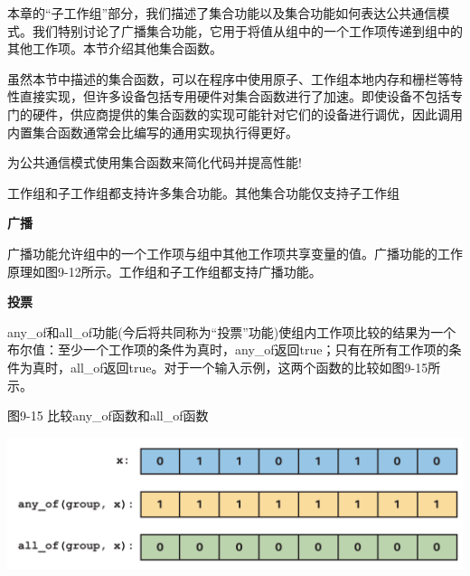 本章的“子工作组”部分，我们描述了集合功能以及集合功能如何表达公共通信模式。我们特别讨论了广播集合功能，它用于将值从组中的一个工作项传递到组中的其他工作项。本节介绍其他集合函数。\par

虽然本节中描述的集合函数，可以在程序中使用原子、工作组本地内存和栅栏等特性直接实现，但许多设备包括专用硬件对集合函数进行了加速。即使设备不包括专门的硬件，供应商提供的集合函数的实现可能针对它们的设备进行调优，因此调用内置集合函数通常会比编写的通用实现执行得更好。\par

\begin{tcolorbox}[colback=red!5!white,colframe=red!75!black]
为公共通信模式使用集合函数来简化代码并提高性能!
\end{tcolorbox}

工作组和子工作组都支持许多集合功能。其他集合功能仅支持子工作组\par

\hspace*{\fill} \par %
\textbf{广播}

广播功能允许组中的一个工作项与组中其他工作项共享变量的值。广播功能的工作原理如图9-12所示。工作组和子工作组都支持广播功能。\par

\hspace*{\fill} \par %
\textbf{投票}

any\_of和all\_of功能(今后将共同称为“投票”功能)使组内工作项比较的结果为一个布尔值：至少一个工作项的条件为真时，any\_of返回true；只有在所有工作项的条件为真时，all\_of返回true。对于一个输入示例，这两个函数的比较如图9-15所示。\par

\hspace*{\fill} \par %
图9-15 比较any\_of函数和all\_of函数
\begin{center}
	\includegraphics[width=1.\textwidth]{content/chapter-9/images/8}
\end{center}

